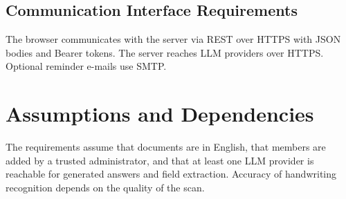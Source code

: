 \subsection{Communication Interface Requirements}
The browser communicates with the server via REST over HTTPS with JSON bodies and Bearer tokens. The
server reaches LLM providers over HTTPS. Optional reminder e-mails use SMTP.

\section{Assumptions and Dependencies}
The requirements assume that documents are in English, that members are added by a trusted
administrator, and that at least one LLM provider is reachable for generated answers and field
extraction. Accuracy of handwriting recognition depends on the quality of the scan.

